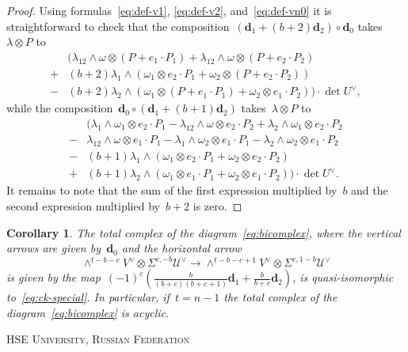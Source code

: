 \documentclass[a4paper]{article}
\newcommand{\cU}{\mathcal{U}}
\newcommand{\vn}{\mathbf{d}}
\newtheorem{corollary}[theorem]{Corollary}
\theoremstyle{remark}
\theoremstyle{definition}
\begin{document}
\begin{proof}
Using formulas~\eqref{eq:def-v1}, \eqref{eq:def-v2}, and~\eqref{eq:def-vn0} it is straightforward to check
that the composition~\mbox{\((\vn_1 + (b + 2)\vn_2) \circ \vn_0\)} takes~\(\lambda \otimes P\) to
\begin{align*}
& (\lambda_{12} \wedge \omega \otimes (P + e_1 \cdot P_1) 
+ \lambda_{12} \wedge \omega \otimes (P + e_2 \cdot P_2)
\\
+ &(b+2) \lambda_1 \wedge (\omega_1 \otimes e_2 \cdot P_1 + \omega_2 \otimes (P + e_2 \cdot P_2)) 
\\
- &(b+2) \lambda_2 \wedge (\omega_1 \otimes (P + e_1 \cdot P_1) + \omega_2 \otimes e_1 \cdot P_2)) \cdot \det U^\vee,
\end{align*}
while the composition~\(\vn_0 \circ (\vn_1 + (b + 1)\vn_2)\) takes~\(\lambda \otimes P\) to
\begin{align*}
& (\lambda_1 \wedge \omega_1 \otimes e_2 \cdot P_1 - \lambda_{12} \wedge \omega \otimes e_2 \cdot P_2 + \lambda_2 \wedge \omega_1 \otimes e_2 \cdot P_2
\\
- & \lambda_{12} \wedge \omega \otimes e_1 \cdot P_1 - \lambda_1 \wedge \omega_2 \otimes e_1 \cdot P_1 - \lambda_2 \wedge \omega_2 \otimes e_1 \cdot P_2
\\
- & (b + 1) \lambda_1 \wedge (\omega_1 \otimes e_2 \cdot P_1 + \omega_2 \otimes e_2 \cdot P_2)
\\
+ & (b + 1) \lambda_2 \wedge (\omega_1 \otimes e_1 \cdot P_1 + \omega_2 \otimes e_1 \cdot P_2)) \cdot \det U^\vee.
\end{align*}
It remains to note that the sum of the first expression multiplied by~\(b\)
and the second expression multiplied by~\(b + 2\) is zero.
\end{proof}

\begin{corollary}
\label{cor:bicomplex-maps}
The total complex of the diagram~\eqref{eq:bicomplex}, where the vertical arrows are given by~\(\vn_0\)
and the horizontal arrow
\begin{equation*}
\wedge^{t-b-c}V^\vee \otimes \Sigma^{c,-b}\cU^\vee \to \wedge^{t-b-c+1}V^\vee \otimes \Sigma^{c,1-b}\cU^\vee 
\end{equation*}
is given by the map~\((-1)^c\left(\tfrac{b}{(b+c)(b+c+1)}\vn_1 + \tfrac{b}{b+c}\vn_2\right)\),
is quasi-isomorphic to~\eqref{eq:ck-special}.
In particular, if~\(t = n -1\) the total complex of the diagram~\eqref{eq:bicomplex} is acyclic.
\end{corollary}



\printbibliography

\textsc{HSE University, Russian Federation}
\end{document}
